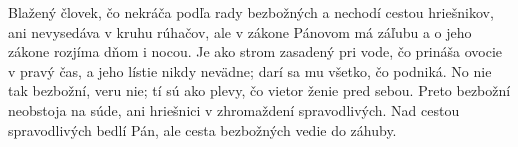 Blažený človek, čo nekráča podľa rady bezbožných
a nechodí cestou hriešnikov,
ani nevysedáva v kruhu rúhačov,
\versseparator
ale v zákone Pánovom má záľubu
a o jeho zákone rozjíma dňom i nocou.
\versseparator
Je ako strom zasadený pri vode,
čo prináša ovocie v pravý čas,
\versseparator
a jeho lístie nikdy nevädne;
darí sa mu všetko, čo podniká.
\versseparator
No nie tak bezbožní, veru nie;
tí sú ako plevy, čo vietor ženie pred sebou.
\versseparator
Preto bezbožní neobstoja na súde,
ani hriešnici v zhromaždení spravodlivých.
\versseparator
Nad cestou spravodlivých bedlí Pán,
ale cesta bezbožných vedie do záhuby. 
